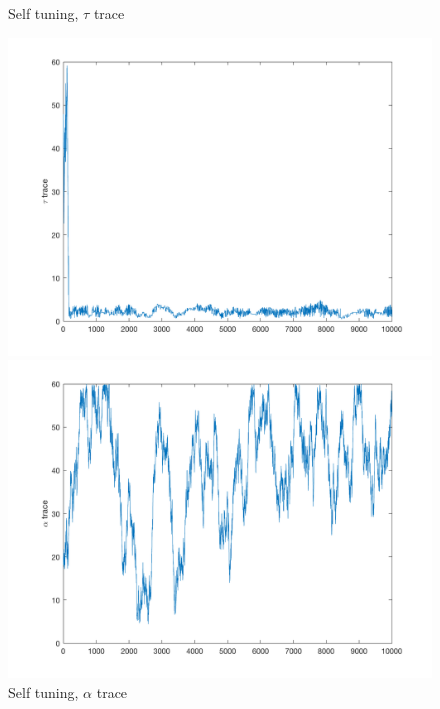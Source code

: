 \documentclass{siamart1116}
\begin{document}
\begin{figure}[!htb]
    \begin{minipage}{0.48\textwidth}
        \centering
        \caption{\label{fig:noncentered_selftuning_tau} Self tuning, $\tau$ trace}
        \includegraphics[width=\linewidth]{graphics/moons/noncentered_selftuning/trace_tau.png}
    \end{minipage} \hfill
    \begin{minipage}{0.48\textwidth}
        \centering
        \caption{\label{fig:noncentered_selftuning_alpha} Self tuning, $\alpha$ trace}
        \includegraphics[width=\linewidth]{graphics/moons/noncentered_selftuning/trace_alpha.png}
    \end{minipage}
\end{figure}
\end{document}
